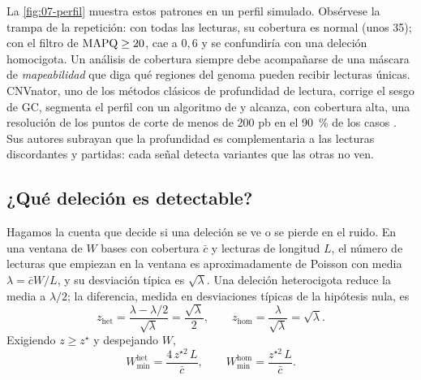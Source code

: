 La \cref{fig:07-perfil} muestra estos patrones en un perfil simulado. Obsérvese la trampa de la repetición: con todas las lecturas, su cobertura es normal (unos 35); con el filtro de $\operatorname{MAPQ}\ge20$, cae a $0{,}6$ y se confundiría con una deleción homocigota. Un análisis de cobertura siempre debe acompañarse de una máscara de \emph{mapeabilidad} que diga qué regiones del genoma pueden recibir lecturas únicas. CNVnator, uno de los métodos clásicos de profundidad de lectura, corrige el sesgo de GC, segmenta el perfil con un algoritmo de  y alcanza, con cobertura alta, una resolución de los puntos de corte de menos de 200 pb en el \SI{90}{\percent} de los casos \parencite{c07-abyzov2011}. Sus autores subrayan que la profundidad es complementaria a las lecturas discordantes y partidas: cada señal detecta variantes que las otras no ven.

\subsection{¿Qué deleción es detectable?}

Hagamos la cuenta que decide si una deleción se ve o se pierde en el ruido. En una ventana de $W$ bases con cobertura $\bar c$ y lecturas de longitud $L$, el número de lecturas que empiezan en la ventana es aproximadamente de Poisson con media $\lambda=\bar cW/L$, y su desviación típica es $\sqrt\lambda$. Una deleción heterocigota reduce la media a $\lambda/2$; la diferencia, medida en desviaciones típicas de la hipótesis nula, es
\begin{equation}\label{eq:07-z}
z_{\text{het}} = \frac{\lambda-\lambda/2}{\sqrt\lambda}=\frac{\sqrt{\lambda}}{2},
\qquad
z_{\text{hom}} = \frac{\lambda}{\sqrt\lambda}=\sqrt\lambda .
\end{equation}
Exigiendo $z\ge z^\star$ y despejando $W$,
\begin{equation}\label{eq:07-wmin}
W_{\min}^{\text{het}} = \frac{4\,z^{\star 2}\,L}{\bar c},\qquad
W_{\min}^{\text{hom}} = \frac{z^{\star 2}\,L}{\bar c}.
\end{equation}

\begin{simbolos}
\end{simbolos}


